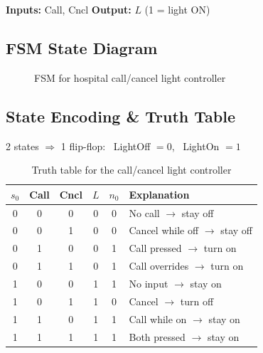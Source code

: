 \documentclass[12pt, a4paper]{article}
\begin{document}
\textbf{Inputs:} Call, Cncl \quad \textbf{Output:} $L$ (1 = light ON)

\subsection{FSM State Diagram}

\begin{figure}[H]
\centering
{}
\caption{FSM for hospital call/cancel light controller}
\end{figure}

\subsection{State Encoding \& Truth Table}

2 states $\Rightarrow$ 1 flip-flop: \ LightOff $= 0$, \ LightOn $= 1$

\begin{table}[H]
\centering
\renewcommand{\arraystretch}{1.3}
\begin{tabular}{@{} c c c | c c | l @{}}
  \toprule
  $s_0$ & Call & Cncl & $L$ & $n_0$ & Explanation \\
  \midrule
  0 & 0 & 0 & 0 & 0 & No call $\to$ stay off \\
  0 & 0 & 1 & 0 & 0 & Cancel while off $\to$ stay off \\
  0 & 1 & 0 & 0 & 1 & Call pressed $\to$ turn on \\
  0 & 1 & 1 & 0 & 1 & Call overrides $\to$ turn on \\
  \midrule
  1 & 0 & 0 & 1 & 1 & No input $\to$ stay on \\
  1 & 0 & 1 & 1 & 0 & Cancel $\to$ turn off \\
  1 & 1 & 0 & 1 & 1 & Call while on $\to$ stay on \\
  1 & 1 & 1 & 1 & 1 & Both pressed $\to$ stay on \\
  \bottomrule
\end{tabular}
\caption{Truth table for the call/cancel light controller}
\end{table}
\end{document}
